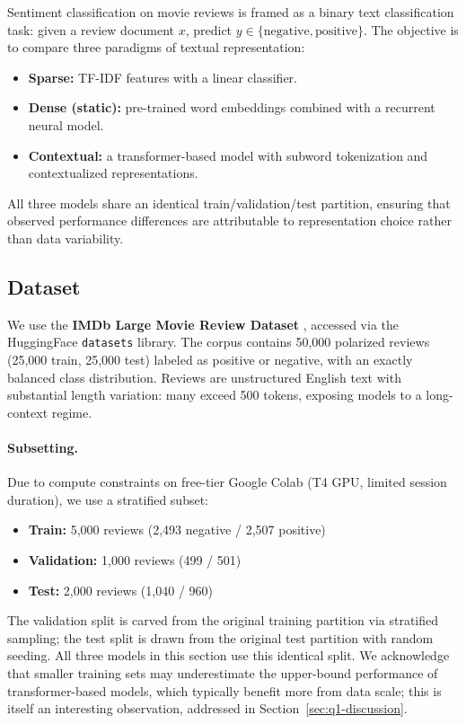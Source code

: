\documentclass[11pt,a4paper]{article}
\begin{document}
Sentiment classification on movie reviews is framed as a binary text classification task: given a review document $x$, predict $y \in \{\text{negative}, \text{positive}\}$. The objective is to compare three paradigms of textual representation:
\begin{itemize}[noitemsep]
    \item \textbf{Sparse:} TF-IDF features with a linear classifier.
    \item \textbf{Dense (static):} pre-trained word embeddings combined with a recurrent neural model.
    \item \textbf{Contextual:} a transformer-based model with subword tokenization and contextualized representations.
\end{itemize}
All three models share an identical train/validation/test partition, ensuring that observed performance differences are attributable to representation choice rather than data variability.

\subsection{Dataset}

We use the \textbf{IMDb Large Movie Review Dataset} \cite{maas2011imdb}, accessed via the HuggingFace \texttt{datasets} library. The corpus contains 50{,}000 polarized reviews (25{,}000 train, 25{,}000 test) labeled as positive or negative, with an exactly balanced class distribution. Reviews are unstructured English text with substantial length variation: many exceed 500 tokens, exposing models to a long-context regime.

\paragraph{Subsetting.} Due to compute constraints on free-tier Google Colab (T4 GPU, limited session duration), we use a stratified subset:
\begin{itemize}[noitemsep]
    \item \textbf{Train:} 5{,}000 reviews (2{,}493 negative / 2{,}507 positive)
    \item \textbf{Validation:} 1{,}000 reviews (499 / 501)
    \item \textbf{Test:} 2{,}000 reviews (1{,}040 / 960)
\end{itemize}
The validation split is carved from the original training partition via stratified sampling; the test split is drawn from the original test partition with random seeding. All three models in this section use this identical split. We acknowledge that smaller training sets may underestimate the upper-bound performance of transformer-based models, which typically benefit more from data scale; this is itself an interesting observation, addressed in Section~\ref{sec:q1-discussion}.
\end{document}

